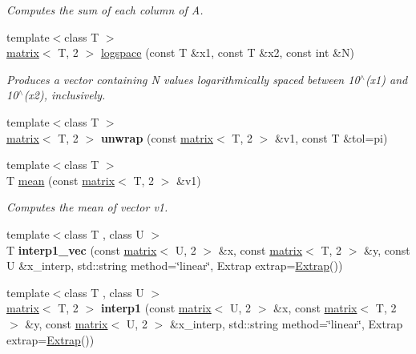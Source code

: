\begin{DoxyCompactItemize}
\begin{DoxyCompactList}\small\item\em Computes the sum of each column of A. \end{DoxyCompactList}\item 
{\footnotesize template$<$class T $>$ }\\\hyperlink{classkeycpp_1_1matrix}{matrix}$<$ T, 2 $>$ \hyperlink{namespacekeycpp_a28626d0ffc4ecda3f9bc6e7b0f4fc4d2}{logspace} (const T \&x1, const T \&x2, const int \&N)
\begin{DoxyCompactList}\small\item\em Produces a vector containing N values logarithmically spaced between 10$^\wedge$(x1) and 10$^\wedge$(x2), inclusively. \end{DoxyCompactList}\item 
\hypertarget{namespacekeycpp_aec240358cae3ca4a4a92c9e7dead409c}{{\footnotesize template$<$class T $>$ }\\\hyperlink{classkeycpp_1_1matrix}{matrix}$<$ T, 2 $>$ {\bfseries unwrap} (const \hyperlink{classkeycpp_1_1matrix}{matrix}$<$ T, 2 $>$ \&v1, const T \&tol=pi)}\label{namespacekeycpp_aec240358cae3ca4a4a92c9e7dead409c}

\item 
\hypertarget{namespacekeycpp_a24ef7ec1e4c2fab43922859a44758da6}{{\footnotesize template$<$class T $>$ }\\T \hyperlink{namespacekeycpp_a24ef7ec1e4c2fab43922859a44758da6}{mean} (const \hyperlink{classkeycpp_1_1matrix}{matrix}$<$ T, 2 $>$ \&v1)}\label{namespacekeycpp_a24ef7ec1e4c2fab43922859a44758da6}

\begin{DoxyCompactList}\small\item\em Computes the mean of vector v1. \end{DoxyCompactList}\item 
\hypertarget{namespacekeycpp_a9c5f11c2b7a3890a0987b9dd10e31cd4}{{\footnotesize template$<$class T , class U $>$ }\\T {\bfseries interp1\-\_\-vec} (const \hyperlink{classkeycpp_1_1matrix}{matrix}$<$ U, 2 $>$ \&x, const \hyperlink{classkeycpp_1_1matrix}{matrix}$<$ T, 2 $>$ \&y, const U \&x\-\_\-interp, std\-::string method=\char`\"{}linear\char`\"{}, Extrap extrap=\hyperlink{classkeycpp_1_1_extrap}{Extrap}())}\label{namespacekeycpp_a9c5f11c2b7a3890a0987b9dd10e31cd4}

\item 
\hypertarget{namespacekeycpp_ab452328f21ddc3131c2df2b3cbbbed7c}{{\footnotesize template$<$class T , class U $>$ }\\\hyperlink{classkeycpp_1_1matrix}{matrix}$<$ T, 2 $>$ {\bfseries interp1} (const \hyperlink{classkeycpp_1_1matrix}{matrix}$<$ U, 2 $>$ \&x, const \hyperlink{classkeycpp_1_1matrix}{matrix}$<$ T, 2 $>$ \&y, const \hyperlink{classkeycpp_1_1matrix}{matrix}$<$ U, 2 $>$ \&x\-\_\-interp, std\-::string method=\char`\"{}linear\char`\"{}, Extrap extrap=\hyperlink{classkeycpp_1_1_extrap}{Extrap}())}\label{namespacekeycpp_ab452328f21ddc3131c2df2b3cbbbed7c}


\end{DoxyCompactItemize}
